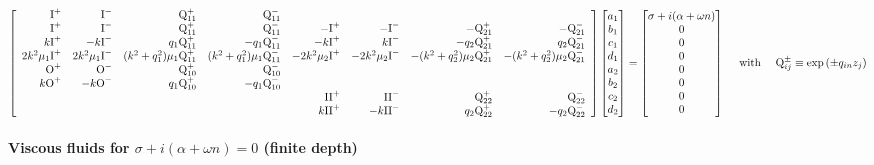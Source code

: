 \documentclass[prfluids]{revtex4-2}
\newcommand{\zeroplu}{\text{O}^+}
\newcommand{\zeromin}{\text{O}^-}
\newcommand{\oneplus}{\text{I}^+}
\newcommand{\onemins}{\text{I}^-}
\newcommand{\twoplus}{\text{II}^+}
\newcommand{\twomins}{\text{II}^-}
\newcommand{\Qplus}[1]{\text{Q}^{+}_{#1}}
\newcommand{\Qmins}[1]{\text{Q}^{-}_{#1}}
\begin{document}
\begin{footnotesize}\begin{eqnarray*}
  \left[\begin{array}{r r r r r r r r }
    \oneplus & \onemins  & \Qplus{11} & \Qmins{11}
    \\
    \oneplus & \onemins  & \Qplus{11} & \Qmins{11} & -\oneplus & -\onemins  &
    -\Qplus{21} & -\Qmins{21}
    \\
    k\oneplus & -k\onemins  & q_1\Qplus{11} & -q_1\Qmins{11} &
    -k\oneplus & k\onemins  & -q_2\Qplus{21} & q_2\Qmins{21}
    \\
    2k^2\mu_1\oneplus & 2k^2\mu_1\onemins  & (k^2+q_1^2)\mu_1\Qplus{11} &
    (k^2+q_1^2)\mu_1\Qmins{11} &
    -2k^2\mu_2\oneplus & -2k^2\mu_2\onemins  & -(k^2+q_2^2)\mu_2\Qplus{21} &
    -(k^2+q_2^2)\mu_2\Qmins{21}
    \\
    \zeroplu & \zeromin  & \Qplus{10} & \Qmins{10}
    \\
    k\zeroplu & -k\zeromin  & q_1\Qplus{10} & -q_1\Qmins{10}
    \\
    &&&& \twoplus & \twomins  & \Qplus{22} & \Qmins{22}
    \\
    &&&& k\twoplus & -k\twomins  & q_2\Qplus{22} & -q_2\Qmins{22}
  \end{array}\right]
  \left[\begin{matrix}
    a_1 \\ b_1 \\ c_1 \\ d_1 \\
    a_2 \\ b_2 \\ c_2 \\ d_2
  \end{matrix}\right]
  =
  \left[\begin{matrix}
    \sigma + i(\alpha + \omega n) \\ 0 \\ 0 \\ 0
    \\ 0 \\ 0 \\ 0 \\ 0
  \end{matrix}\right]
  \quad\text{ with }\quad \text{Q}^\pm_{ij} \equiv \exp{(\pm q_{in} z_j)}
\end{eqnarray*}\end{footnotesize}

\paragraph{Viscous fluids for $\sigma + i(\alpha + \omega n)=0$ (finite depth)}
\end{document}
